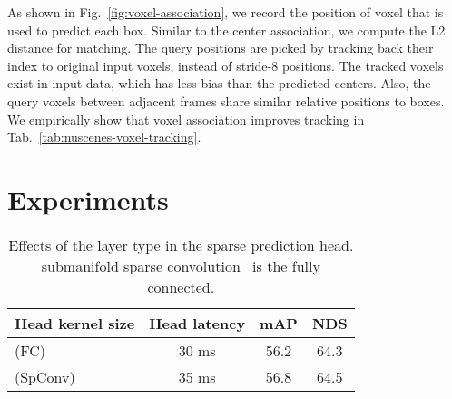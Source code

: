\documentclass[10pt,twocolumn,letterpaper]{article}
\begin{document}
{As shown in Fig.~\ref{fig:voxel-association}, we record the position of voxel that is used to predict each box. Similar to the center association, we compute the L2 distance for matching. The query positions are picked by tracking back their index to original input voxels, instead of stride-8 positions.  The tracked voxels exist in input data, which has less bias than the predicted centers. Also, the query voxels between adjacent frames share similar relative positions to boxes. We empirically show that voxel association improves tracking in Tab.~\ref{tab:nuscenes-voxel-tracking}.

\section{Experiments}
\label{sec:experiments}

\begin{table}[t]
\begin{center}
\caption{Ablations on 2D or 3D sparse CNN in VoxelNeXt. sparse height Compression is used to connect 3D backbone and 2D head.}
\label{tab:ablation-sparse-bev-compression}
\end{center}
\end{table}
\begin{table}[t]
\begin{center}
\caption{Effects of the layer type in the sparse prediction head.  submanifold sparse convolution~\cite{submanifold-sparse-conv-v2} is the fully connected.}
\begin{tabular}{|l|c|cc|}
\hline
{Head kernel size} &  Head latency   &   mAP    & NDS  \\ \hline
 (FC) & 30 ms & 56.2 & 64.3 \\
 (SpConv) & 35 ms & 56.8 & 64.5 \\
\hline
\end{tabular}
\label{tab:head-sparse-conv}
\end{center}
\end{table}

}
\end{document}
